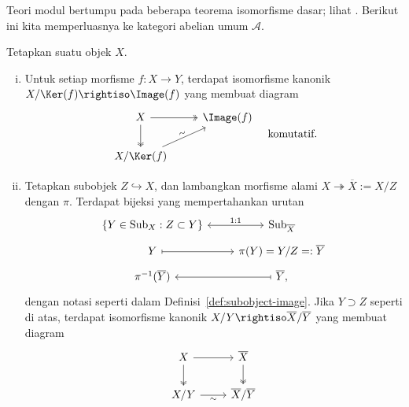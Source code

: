 Teori modul bertumpu pada beberapa teorema isomorfisme dasar; lihat
\cite[Proposisi 6.1.11, 6.1.12, 6.1.13]{Li1}. Berikut ini kita memperluasnya
ke kategori abelian umum $\mathcal{A}$.

\begin{teorema}\label{prop:Abel-cat-isom-thm}
	Tetapkan suatu objek $X$.
	\begin{enumerate}[(i)]
		\item Untuk setiap morfisme $f:X\to Y$, terdapat isomorfisme kanonik
		$X/\Ker(f)\rightiso\Image(f)$ yang membuat diagram
		\[\begin{tikzcd}
			X \arrow[twoheadrightarrow, r] \arrow[twoheadrightarrow, d] & \Image(f) \\
			X/\Ker(f) \arrow[ru, "\sim" sloped]
		\end{tikzcd} \quad \text{komutatif}. \]
		\item Tetapkan subobjek $Z\hookrightarrow X$, dan lambangkan morfisme
		alami $X\twoheadrightarrow\overline{X}:=X/Z$ dengan $\pi$. Terdapat
		bijeksi yang mempertahankan urutan
		\[\begin{tikzcd}[row sep=tiny]
			\left\{ Y \in \mathrm{Sub}_X : Z \subset Y \right\} \arrow[leftrightarrow, r, "1:1"] & \mathrm{Sub}_{\overline{X}} \\
			Y \arrow[r, mapsto] & \pi(Y) = Y/Z =: \overline{Y} \\
			\pi^{-1}(\overline{Y}) & \overline{Y} \arrow[mapsto, l] ,
		\end{tikzcd}\]
		dengan notasi seperti dalam Definisi~\ref{def:subobject-image}. Jika
		$Y\supset Z$ seperti di atas, terdapat isomorfisme kanonik
		$X/Y\rightiso\overline{X}/\overline{Y}$ yang membuat diagram
		\[\begin{tikzcd}
			X \arrow[r] \arrow[twoheadrightarrow, d] & \overline{X} \arrow[twoheadrightarrow, d] \\
			X/Y \arrow[r, "\sim"'] & \overline{X}/\overline{Y}
		\end{tikzcd}\]

\end{enumerate}
\end{teorema}

